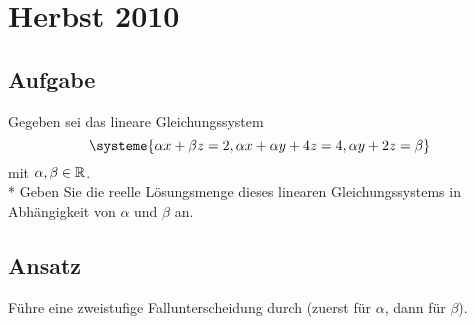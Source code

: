 \newpage


\section{Herbst 2010}

\subsection{Aufgabe}
Gegeben sei das lineare Gleichungssystem
\begin{equation*}
	\systeme{\alpha x+\beta z=2, \alpha x+\alpha y+4z=4, \alpha y+2z = \beta}
\end{equation*}
mit \( \alpha, \beta \in \mathbb{R} \). \\*
Geben Sie die reelle Lösungsmenge dieses linearen Gleichungssystems in Abhängigkeit von \( \alpha \) und \( \beta \) an.

\subsection{Ansatz}
Führe eine zweistufige Fallunterscheidung durch (zuerst für \( \alpha \), dann für \( \beta \)).

